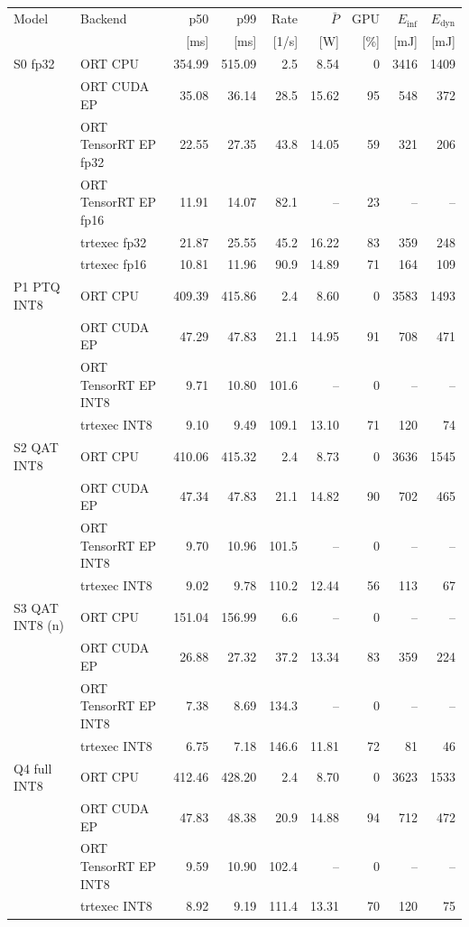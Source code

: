 \begin{tabular}{@{}llrrrrrrr@{}}
\toprule
Model & Backend & p50 & p99 & Rate & $\bar P$ & GPU & $E_{\mathrm{inf}}$ & $E_{\mathrm{dyn}}$ \\
 & & [ms] & [ms] & [1/s] & [W] & [\%] & [mJ] & [mJ] \\
\midrule
S0 fp32 & ORT CPU & 354.99 & 515.09 & 2.5 & 8.54 & 0 & 3416 & 1409 \\
 & ORT CUDA EP & 35.08 & 36.14 & 28.5 & 15.62 & 95 & 548 & 372 \\
 & ORT TensorRT EP fp32 & 22.55 & 27.35 & 43.8 & 14.05 & 59 & 321 & 206 \\
 & ORT TensorRT EP fp16 & 11.91 & 14.07 & 82.1 & -- & 23 & -- & -- \\
 & trtexec fp32 & 21.87 & 25.55 & 45.2 & 16.22 & 83 & 359 & 248 \\
 & trtexec fp16 & 10.81 & 11.96 & 90.9 & 14.89 & 71 & 164 & 109 \\
\addlinespace
P1 PTQ INT8 & ORT CPU & 409.39 & 415.86 & 2.4 & 8.60 & 0 & 3583 & 1493 \\
 & ORT CUDA EP & 47.29 & 47.83 & 21.1 & 14.95 & 91 & 708 & 471 \\
 & ORT TensorRT EP INT8 & 9.71 & 10.80 & 101.6 & -- & 0 & -- & -- \\
 & trtexec INT8 & 9.10 & 9.49 & 109.1 & 13.10 & 71 & 120 & 74 \\
\addlinespace
S2 QAT INT8 & ORT CPU & 410.06 & 415.32 & 2.4 & 8.73 & 0 & 3636 & 1545 \\
 & ORT CUDA EP & 47.34 & 47.83 & 21.1 & 14.82 & 90 & 702 & 465 \\
 & ORT TensorRT EP INT8 & 9.70 & 10.96 & 101.5 & -- & 0 & -- & -- \\
 & trtexec INT8 & 9.02 & 9.78 & 110.2 & 12.44 & 56 & 113 & 67 \\
\addlinespace
S3 QAT INT8 (n) & ORT CPU & 151.04 & 156.99 & 6.6 & -- & 0 & -- & -- \\
 & ORT CUDA EP & 26.88 & 27.32 & 37.2 & 13.34 & 83 & 359 & 224 \\
 & ORT TensorRT EP INT8 & 7.38 & 8.69 & 134.3 & -- & 0 & -- & -- \\
 & trtexec INT8 & 6.75 & 7.18 & 146.6 & 11.81 & 72 & 81 & 46 \\
\addlinespace
Q4 full INT8 & ORT CPU & 412.46 & 428.20 & 2.4 & 8.70 & 0 & 3623 & 1533 \\
 & ORT CUDA EP & 47.83 & 48.38 & 20.9 & 14.88 & 94 & 712 & 472 \\
 & ORT TensorRT EP INT8 & 9.59 & 10.90 & 102.4 & -- & 0 & -- & -- \\
 & trtexec INT8 & 8.92 & 9.19 & 111.4 & 13.31 & 70 & 120 & 75 \\
\bottomrule
\end{tabular}
